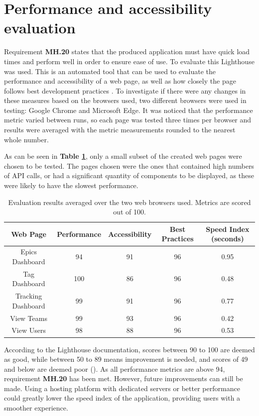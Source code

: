 \documentclass[l4proj.tex]{subfiles}
\begin{document}
\section{Performance and accessibility evaluation}
Requirement \textbf{MH.20} states that the produced application must have quick load times and perform well in order to ensure ease of use. To evaluate this Lighthouse was used. This is an automated tool that can be used to evaluate the performance and accessibility of a web page, as well as how closely the page follows best development practices \cite{LighthouseOverview}. To investigate if there were any changes in these measures based on the browsers used, two different browsers were used in testing: Google Chrome and Microsoft Edge. It was noticed that the performance metric varied between runs, so each page was tested three times per browser and results were averaged with the metric measurements rounded to the nearest whole number. 


As can be seen in \textbf{Table \ref{perfomance-metrics-table}}, only a small subset of the created web pages were chosen to be tested. The pages chosen were the ones that contained high numbers of API calls, or had a significant quantity of components to be displayed, as these were likely to have the slowest performance. 

\begin{center}
\begin{table}[h!]
\begin{tabular}{| c | c | c | c | c |}
\hline
 Web Page & Performance & Accessibility & Best Practices & Speed Index (seconds) \\ 
 \hline
 Epics Dashboard & 94 & 91 & 96 & 0.95 \\  
 Tag Dashboard & 100 & 86 & 96 & 0.48    \\
 Tracking Dashboard  & 99 & 91 & 96 & 0.77  \\
 View Teams & 99 & 93 & 96 & 0.42 \\
 View Users & 98 & 88 & 96 & 0.53\\
 \hline
\end{tabular}
\caption{Evaluation results averaged over the two web browsers used. Metrics are scored out of 100.}
\label{perfomance-metrics-table}
\end{table}
\end{center}

According to the Lighthouse documentation, scores between 90 to 100 are deemed as good, while between 50 to 89 means improvement is needed, and scores of 49 and below are deemed poor (\cite{LighthouseColourCoding}). As all performance metrics are above 94, requirement \textbf{MH.20} has been met. However, future improvements can still be made. Using a hosting platform with dedicated servers or better performance could greatly lower the speed index of the application, providing users with a smoother experience. 
\end{document}
